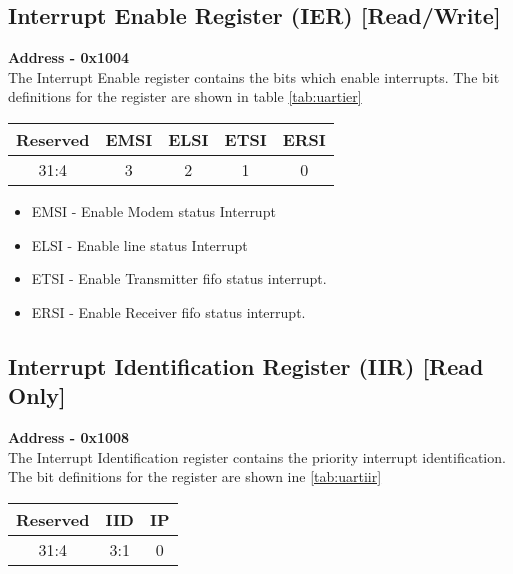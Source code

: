 \documentclass[12pt,a4paper]{report}
\begin{document}
\subsection{Interrupt Enable Register (IER)  [Read/Write] }
\hspace{1.6cm}
\textbf{Address - 0x1004}
\\
\hspace{1.6cm}
 The Interrupt Enable register contains
the bits which enable interrupts. The bit definitions for the register are shown in table \ref{tab:uartier}


\begin{center}
\begin{tabular}{|c|c|c|c|c| } 
 \hline
 Reserved   & EMSI & ELSI &  ETSI &  ERSI \\ 
\hline
31:4 & 3  &  2 & 1 & 0\\
 \hline
\end{tabular}
\end{center}


\begin{itemize}
\item EMSI - Enable Modem status Interrupt
\item ELSI - Enable line status Interrupt
\item ETSI - Enable Transmitter fifo status interrupt.
\item ERSI - Enable Receiver fifo status interrupt.
\end{itemize}

\subsection{Interrupt Identification Register (IIR)  [Read Only] }
\hspace{1.6cm}
\textbf{Address - 0x1008}
\\
\hspace{1.6cm}
The Interrupt Identification register
contains the priority interrupt identification. The bit definitions for the register are shown ine \ref{tab:uartiir}

\begin{center}
\begin{tabular}{|c|c|c| } 
 \hline
 Reserved   & IID & IP \\ 
\hline
31:4 & 3:1 & 0\\
 \hline
\end{tabular}

\end{center}
\end{document}
